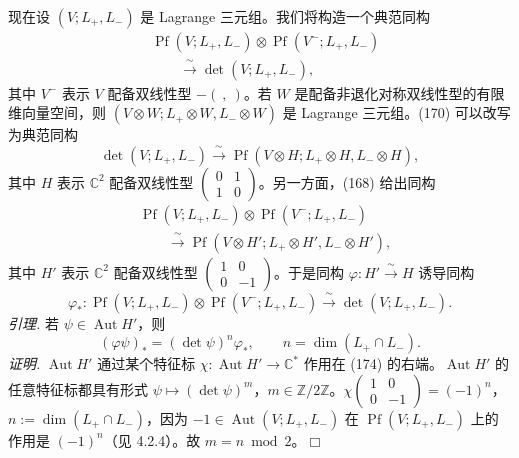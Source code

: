  现在设 $(V;L_{+},L_{-})$ 是 Lagrange 三元组。我们将构造一个典范同构
\begin{equation}\tag{172}
\begin{aligned}
&\operatorname{Pf}(V;L_{+},L_{-})\otimes\operatorname{Pf}(V^{-};L_{+},L_{-})\\
&\qquad\xrightarrow{\ \sim\ }\det(V;L_{+},L_{-}),
\end{aligned}
\end{equation}
其中 $V^{-}$ 表示 $V$ 配备双线性型 $-(\ ,\ )$。若 $W$ 是配备非退化对称双线性型的有限维向量空间，则 $(V\otimes W;L_{+}\otimes W,L_{-}\otimes W)$ 是 Lagrange 三元组。(170) 可以改写为典范同构
\begin{equation}\tag{173}
\det(V;L_{+},L_{-})\xrightarrow{\ \sim\ }\operatorname{Pf}(V\otimes H;L_{+}\otimes H,L_{-}\otimes H),
\end{equation}
其中 $H$ 表示 $\mathbb{C}^{2}$ 配备双线性型 $\begin{pmatrix}0&1\\1&0\end{pmatrix}$。另一方面，(168) 给出同构
\begin{equation}\tag{174}
\begin{aligned}
&\operatorname{Pf}(V;L_{+},L_{-})\otimes\operatorname{Pf}(V^{-};L_{+},L_{-})\\
&\qquad\xrightarrow{\ \sim\ }\operatorname{Pf}(V\otimes H';L_{+}\otimes H',L_{-}\otimes H'),
\end{aligned}
\end{equation}
其中 $H'$ 表示 $\mathbb{C}^{2}$ 配备双线性型 $\begin{pmatrix}1&0\\0&-1\end{pmatrix}$。于是同构 $\varphi:H'\xrightarrow{\ \sim\ }H$ 诱导同构
\[
\varphi_{*}:\operatorname{Pf}(V;L_{+},L_{-})\otimes\operatorname{Pf}(V^{-};L_{+},L_{-})\xrightarrow{\ \sim\ }\det(V;L_{+},L_{-}).
\]
\emph{引理.} 若 $\psi\in\operatorname{Aut}H'$，则
\begin{equation}\tag{175}
(\varphi\psi)_{*}=(\det\psi)^{n}\varphi_{*},\qquad n=\dim(L_{+}\cap L_{-}).
\end{equation}
\emph{证明.} $\operatorname{Aut}H'$ 通过某个特征标 $\chi:\operatorname{Aut}H'\to\mathbb{C}^{*}$ 作用在 (174) 的右端。$\operatorname{Aut}H'$ 的任意特征标都具有形式 $\psi\mapsto(\det\psi)^{m}$，$m\in\mathbb{Z}/2\mathbb{Z}$。$\chi\begin{pmatrix}1&0\\0&-1\end{pmatrix}=(-1)^{n}$，$n:=\dim(L_{+}\cap L_{-})$，因为 $-1\in\operatorname{Aut}(V;L_{+},L_{-})$ 在 $\operatorname{Pf}(V;L_{+},L_{-})$ 上的作用是 $(-1)^{n}$（见 4.2.4）。故 $m=n\bmod 2$。\hfill$\Box$


